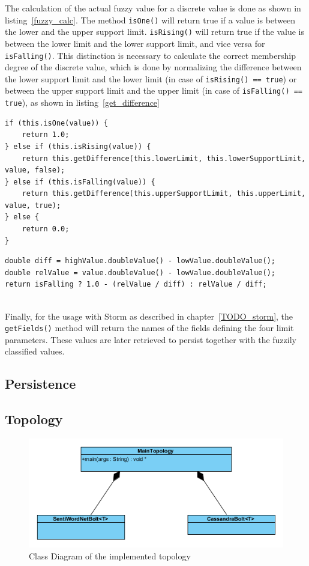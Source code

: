 \documentclass[a4paper]{article}
\begin{document}
The calculation of the actual fuzzy value for a discrete value is done as shown in listing~\ref{fuzzy_calc}. The method \texttt{isOne()} will return true if a value is between the lower and the upper support limit. \texttt{isRising()} will return true if the value is between the lower limit and the lower support limit, and vice versa for \texttt{isFalling()}. This distinction is necessary to calculate the correct membership degree of the discrete value, which is done by normalizing the difference between the lower support limit and the lower limit (in case of \texttt{isRising() == true}) or between the upper support limit and the upper limit (in case of \texttt{isFalling() == true}), as shown in listing~\ref{get_difference}
\begin{lstlisting}
if (this.isOne(value)) {
	return 1.0;
} else if (this.isRising(value)) {
	return this.getDifference(this.lowerLimit, this.lowerSupportLimit, value, false);
} else if (this.isFalling(value)) {
	return this.getDifference(this.upperSupportLimit, this.upperLimit, value, true);
} else {
	return 0.0;
}
\end{lstlisting}
\begin{lstlisting}
double diff = highValue.doubleValue() - lowValue.doubleValue();
double relValue = value.doubleValue() - lowValue.doubleValue();
return isFalling ? 1.0 - (relValue / diff) : relValue / diff;
 
\end{lstlisting}

Finally, for the usage with Storm as described in chapter~\ref{TODO_storm}, the \texttt{getFields()} method will return the names of the fields defining the four limit parameters. These values are later retrieved to persist together with the fuzzily classified values.

\subsection{Persistence}


\subsection{Topology}\label{section_topology}
\begin{figure}[h!]
	\centering
	\includegraphics[scale=2.5]{images/uml_topology.png}
	\caption{Class Diagram of the implemented topology}
	\label{uml_topology}
\end{figure}
\end{document}
